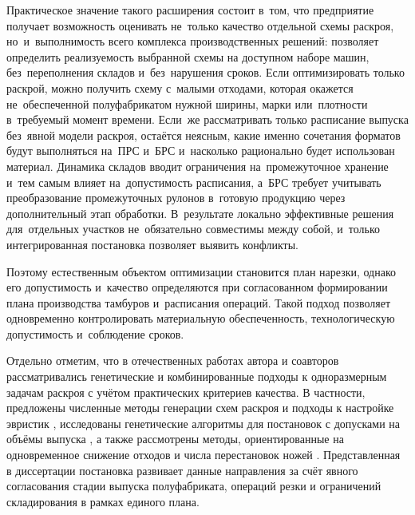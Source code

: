 Практическое значение такого расширения состоит в~том, что предприятие получает возможность оценивать не~только качество отдельной схемы раскроя, но~и~выполнимость всего комплекса производственных решений: позволяет определить реализуемость выбранной схемы на доступном наборе машин, без~переполнения складов и~без~нарушения сроков.
Если оптимизировать только раскрой, можно получить схему с~малыми отходами, которая окажется не~обеспеченной полуфабрикатом нужной ширины, марки или~плотности в~требуемый момент времени.
Если~же рассматривать только расписание выпуска без~явной модели раскроя, остаётся неясным, какие именно сочетания форматов будут выполняться на~ПРС и~БРС и~насколько рационально будет использован материал.
Динамика складов вводит ограничения на~промежуточное хранение и~тем самым влияет на~допустимость расписания, а~БРС требует учитывать преобразование промежуточных рулонов в~готовую продукцию через дополнительный этап обработки.
В~результате локально эффективные решения для~отдельных участков не~обязательно совместимы между собой, и~только интегрированная постановка позволяет выявить конфликты.

Поэтому естественным объектом оптимизации становится план нарезки, однако его допустимость и~качество определяются при согласованном формировании плана производства тамбуров и~расписания операций.
Такой подход позволяет одновременно контролировать материальную обеспеченность, технологическую допустимость и~соблюдение сроков.


Отдельно отметим, что в отечественных работах автора и соавторов рассматривались генетические и комбинированные подходы к одноразмерным задачам раскроя с учётом практических критериев качества.
В частности, предложены численные методы генерации схем раскроя и подходы к настройке эвристик \cite{klimenko2024moscow}, исследованы генетические алгоритмы для постановок с допусками на объёмы выпуска \cite{klimenko2024_prin}, а также рассмотрены методы, ориентированные на одновременное снижение отходов и числа перестановок ножей \cite{klimenko2025ivdon,klimenko2025fruct}.
Представленная в диссертации постановка развивает данные направления за счёт явного согласования стадии выпуска полуфабриката, операций резки и ограничений складирования в рамках единого плана.


\FloatBarrier

